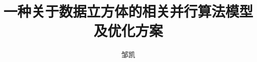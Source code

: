 \documentclass[bachelor]{ustcthesis}
\title{一种关于数据立方体的相关并行算法模型及优化方案}
\author{邹凯}
\begin{document}
\maketitle

%
%
%

\frontmatter

\tableofcontents

\listoffigures
\listoftables
\listofalgorithms  %
% 

\mainmatter










\backmatter
% 
% 
% 
% 
% 
% 
% 
% 
\end{document}
